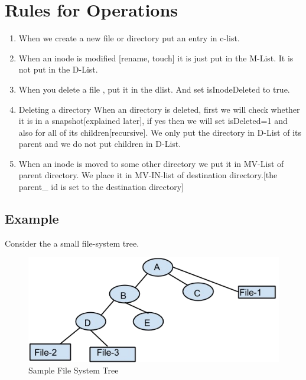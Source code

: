 \section{Rules for Operations}
\begin{enumerate}

\item  When we create a new file or directory put an entry in c-list.

\item When an inode is modified [rename, touch] it is just put in the M-List. It is not put in the D-List.

\item When you delete a file , put it in the dlist. And set isInodeDeleted to true.

\item Deleting a directory
When an directory is deleted, first we will check  whether it is in a snapshot[explained later], if yes then we will set isDeleted=1 and also for all of its children[recursive]. We only put the directory in D-List of its parent and we do not put children in D-List.

\item When an inode is moved to some other directory we put it in  MV-List of parent directory. We place it in MV-IN-list of destination  directory.[the parent\_ id is set to the destination directory]

\end{enumerate}

\subsection{Example}
Consider the a small file-system tree.\\
\begin{figure}[!h]
\centering  
 \includegraphics[scale=0.5]{figs/preliminar/FileSystemExample.png}
  \caption{Sample File System Tree}
  \label{fig:ExampleFileSystem}
\end{figure}


